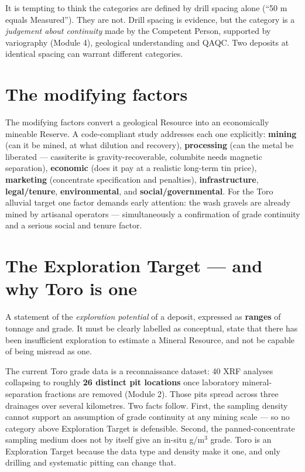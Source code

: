 \documentclass[11pt]{article}
\begin{document}
\begin{pitbox}
It is tempting to think the categories are defined by drill spacing alone
(``50 m equals Measured''). They are not. Drill spacing is evidence, but
the category is a \emph{judgement about continuity} made by the Competent
Person, supported by variography (Module 4), geological understanding and
QAQC. Two deposits at identical spacing can warrant different categories.
\end{pitbox}

\section{The modifying factors}

The modifying factors convert a geological Resource into an economically
mineable Reserve. A code-compliant study addresses each one explicitly:
\textbf{mining} (can it be mined, at what dilution and recovery),
\textbf{processing} (can the metal be liberated --- cassiterite is
gravity-recoverable, columbite needs magnetic separation),
\textbf{economic} (does it pay at a realistic long-term tin price),
\textbf{marketing} (concentrate specification and penalties),
\textbf{infrastructure}, \textbf{legal/tenure}, \textbf{environmental},
and \textbf{social/governmental}. For the Toro alluvial target one factor
demands early attention: the wash gravels are already mined by artisanal
operators --- simultaneously a confirmation of grade continuity and a
serious social and tenure factor.

\section{The Exploration Target --- and why Toro is one}

\begin{defbox}
A statement of the \emph{exploration potential} of a deposit, expressed
as \textbf{ranges} of tonnage and grade. It must be clearly labelled as
conceptual, state that there has been insufficient exploration to
estimate a Mineral Resource, and not be capable of being misread as one.
\end{defbox}

\begin{torobox}
The current Toro grade data is a reconnaissance dataset: 40 XRF analyses
collapsing to roughly \textbf{26 distinct pit locations} once laboratory
mineral-separation fractions are removed (Module 2). Those pits spread
across three drainages over several kilometres. Two facts follow. First,
the sampling density cannot support an assumption of grade continuity at
any mining scale --- so no category above Exploration Target is
defensible. Second, the panned-concentrate sampling medium does not by
itself give an in-situ g/m$^3$ grade. Toro is an Exploration Target
because the data type and density make it one, and only drilling and
systematic pitting can change that.
\end{torobox}
\end{document}
